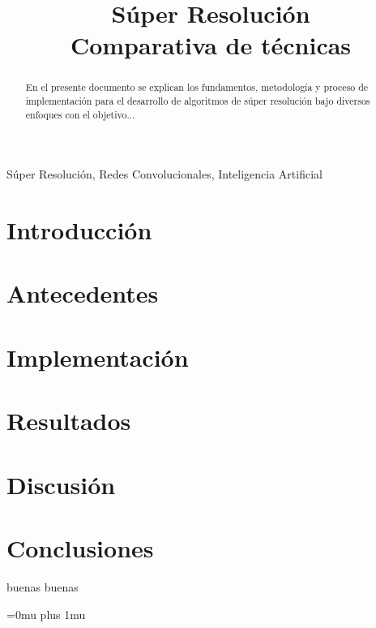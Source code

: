 \documentclass[journal, onecolumn]{IEEEtran}
\numberwithin{equation}{section}
\numberwithin{figure}{section}
\numberwithin{table}{section}
\begin{document}
    \title{Súper Resolución\\
    \small{Comparativa de técnicas}}

    
    \author{
    }

    \maketitle

    \begin{abstract}
        En el presente documento se explican los fundamentos, metodología y proceso de implementación 
        para el desarrollo de algoritmos de súper resolución bajo diversos enfoques con el objetivo... 
    \end{abstract}

    \begin{IEEEkeywords}
    Súper Resolución, Redes Convolucionales, Inteligencia Artificial
    \end{IEEEkeywords}

    \section{Introducción}

    


    
    

    \section{Antecedentes}
    



    \section{Implementación}

    \section{Resultados}

    \section{Discusión}


    \section{Conclusiones}
    \noindent buenas buenas 


    \nocite{*}

    \Urlmuskip=0mu plus 1mu\relax
    
    
\end{document}
